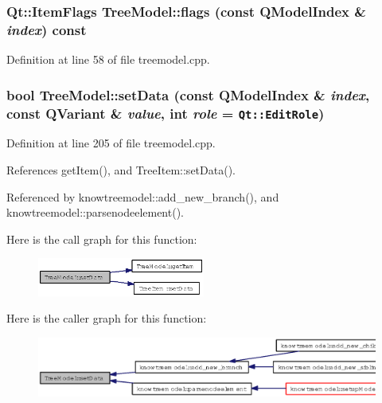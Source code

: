 \subsubsection{\setlength{\rightskip}{0pt plus 5cm}Qt::Item\-Flags Tree\-Model::flags (const QModel\-Index \& {\em index}) const}\label{classTreeModel_2f793c5b11ec3c46571e4598ee2398e7}




Definition at line 58 of file treemodel.cpp.
\subsubsection{\setlength{\rightskip}{0pt plus 5cm}bool Tree\-Model::set\-Data (const QModel\-Index \& {\em index}, const QVariant \& {\em value}, int {\em role} = {\tt Qt::EditRole})}\label{classTreeModel_cd3341eaa58b720ea4e6d6a415145dbd}




Definition at line 205 of file treemodel.cpp.

References get\-Item(), and Tree\-Item::set\-Data().

Referenced by knowtreemodel::add\_\-new\_\-branch(), and knowtreemodel::parsenodeelement().

Here is the call graph for this function:\begin{figure}[H]
\begin{center}
\leavevmode
\includegraphics[width=156pt]{classTreeModel_cd3341eaa58b720ea4e6d6a415145dbd_cgraph}
\end{center}
\end{figure}


Here is the caller graph for this function:\begin{figure}[H]
\begin{center}
\leavevmode
\includegraphics[width=328pt]{classTreeModel_cd3341eaa58b720ea4e6d6a415145dbd_icgraph}
\end{center}
\end{figure}
